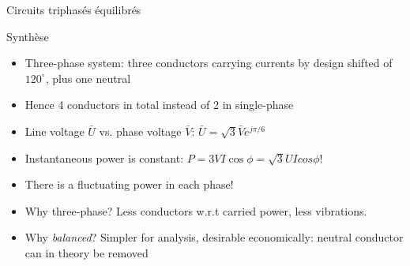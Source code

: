 \begin{frame} {Circuits triphasés équilibrés}
	\begin{block}{Synthèse}
		\begin{itemize}
			\item Three-phase system: three conductors carrying currents by design shifted of $120^\circ$,  plus one neutral \item Hence 4 conductors in total instead of 2 in single-phase
			\item Line voltage $\bar{U}$ vs. phase voltage $\bar{V}$: $\bar{U}=\sqrt{3} \bar{V} e^{j \pi / 6}$			
			\item Instantaneous power is constant: $P=3VI \cos \phi  = \sqrt{3} UI cos \phi$!
			\item There is a fluctuating power in each phase!
			\item Why three-phase? Less conductors w.r.t carried power, less vibrations.
			\item Why \textit{balanced}? Simpler for analysis, desirable economically: neutral conductor can in theory be removed
		\end{itemize}
	\end{block}
\end{frame}


